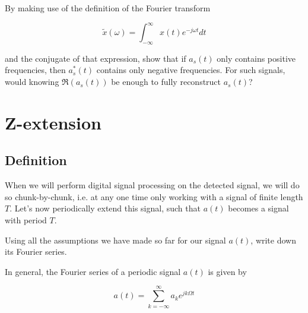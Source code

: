 \pagebreak

\begin{exer}
By making use of the definition of the Fourier transform 

$$\tilde{x}(\omega) = \int_{-\infty}^{\infty}x(t) e^{-j \omega t} dt$$

and the conjugate of that expression, show that if $a_s(t)$ only contains positive frequencies, then $a_s^*(t)$ contains only negative frequencies. For such signals, would knowing $\Re \left(a_s(t) \right)$ be enough to fully reconstruct $a_s(t)$?
\end{exer}

\pagebreak

\section{Z-extension}

\subsection{Definition}

When we will perform digital signal processing on the detected signal, we will do so chunk-by-chunk, i.e. at any one time only working with a signal of finite length $T$. Let's now periodically extend this signal, such that $a(t)$ becomes a signal with period $T$.

\begin{cue}
Using all the assumptions we have made so far for our signal $a(t)$, write down its Fourier series.
\end{cue}

In general, the Fourier series of a periodic signal $a(t)$ is given by

\begin{equation}
a(t) = \sum_{k=-\infty}^\infty a_k e^{jk\Omega t}
\end{equation}

